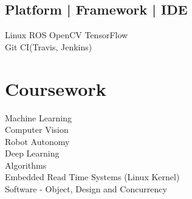 \documentclass[]{resume-openfont}
\begin{document}
\begin{minipage}[t]{0.36\textwidth}
\subsection{Platform | Framework | IDE}
Linux \textbullet{} ROS \textbullet{} OpenCV \textbullet{} TensorFlow\\
Git \textbullet{} CI(Travis, Jenkins)
\sectionsep


\section{Coursework}
Machine Learning \\
Computer Vision \\
Robot Autonomy \\
Deep Learning \\
Algorithms \\
Embedded Read Time Systems (Linux Kernel) \\
Software - Object, Design and Concurrency \\
\sectionsep


%
%

\end{minipage} 
\hfill
\end{document}
